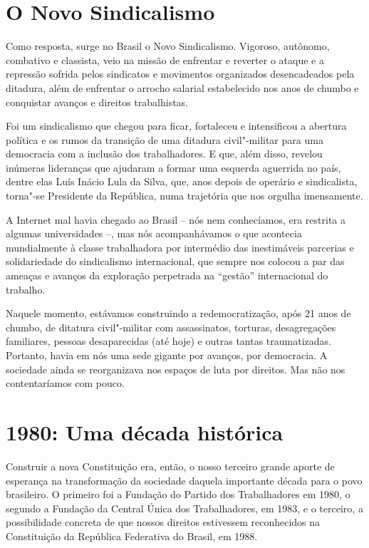 \section{O Novo Sindicalismo}

Como resposta, surge no Brasil o Novo Sindicalismo. Vigoroso, autônomo,
combativo e classista, veio na missão de enfrentar e reverter o
ataque e a repressão sofrida pelos sindicatos e movimentos organizados
desencadeados pela ditadura, além de enfrentar o arrocho salarial
estabelecido nos anos de chumbo e conquistar avanços e direitos
trabalhistas.

Foi um sindicalismo que chegou para ficar, fortaleceu e intensificou a
abertura política e os rumos da transição de uma ditadura civil"-militar
para uma democracia com a inclusão dos trabalhadores. E que, além disso, revelou
inúmeras lideranças que ajudaram a formar uma esquerda aguerrida no
país, dentre elas Luís Inácio Lula da Silva, que, anos depois de operário
e sindicalista, torna"-se Presidente da República, numa trajetória que
nos orgulha imensamente.

A Internet mal havia chegado ao Brasil -- nós nem conhecíamos, era
restrita a algumas universidades --, mas nós acompanhávamos o que acontecia
mundialmente à classe trabalhadora por intermédio das inestimáveis
parcerias e solidariedade do sindicalismo internacional, que sempre nos
colocou a par das ameaças e avanços da exploração perpetrada na
``gestão'' internacional do trabalho.

Naquele momento, estávamos construindo a redemocratização, após 21 anos
de chumbo, de ditatura civil"-militar com assassinatos, torturas,
desagregações familiares, pessoas desaparecidas (até hoje) e outras
tantas traumatizadas. Portanto, havia em nós uma sede gigante
por avanços, por democracia. A sociedade ainda se reorganizava nos
espaços de luta por direitos. Mas não nos contentaríamos com pouco.

\section{1980: Uma década histórica}

Construir a nova Constituição era, então, o nosso terceiro grande aporte
de esperança na transformação da sociedade daquela importante década
para o povo brasileiro. O primeiro foi a Fundação do Partido dos
Trabalhadores em 1980, o segundo a Fundação da Central Única dos
Trabalhadores, em 1983, e o terceiro, a possibilidade concreta de que
nossos direitos estivessem reconhecidos na Constituição da República
Federativa do Brasil, em 1988.

